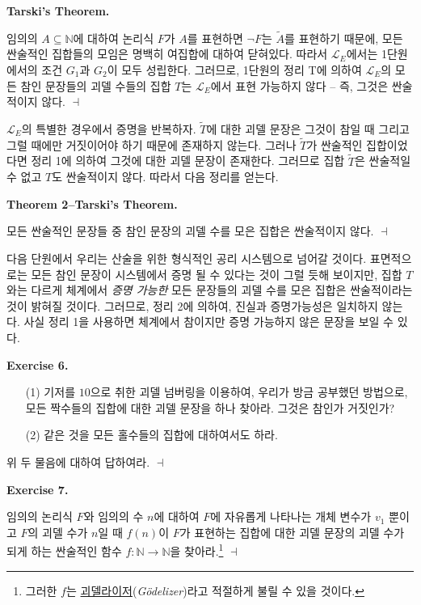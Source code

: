 \documentclass[12pt]{paper}
\newenvironment{context}[1][]
{ \noindent \textbf{{#1}.}
}
{ \hfill $ \dashv $
}
\begin{document}
\begin{context}[Tarski's Theorem]
임의의 $A \subseteq \mathbb{N}$에 대하여 논리식 $F$가 $A$를 표현하면 $\lnot F$는 $\tilde{A}$를 표현하기 때문에,
모든 싼술적인 집합들의 모임은 명백히 여집합에 대하여 닫혀있다.
따라서 $\mathcal{L}_{E}$에서는 1단원에서의 조건 $G_1$과 $G_2$이 모두 성립한다.
그러므로, 1단원의 정리 T에 의하여 $\mathcal{L}_{E}$의 모든 참인 문장들의 괴델 수들의 집합 $T$는 $\mathcal{L}_{E}$에서 표현 가능하지 않다 --
즉, 그것은 싼술적이지 않다.
\end{context}

$\mathcal{L}_{E}$의 특별한 경우에서 증명을 반복하자.
$\tilde{T}$에 대한 괴델 문장은 그것이 참일 때 그리고 그럴 때에만 거짓이어야 하기 때문에 존재하지 않는다.
그러나 $\tilde{T}$가 싼술적인 집합이었다면 정리 1에 의하여 그것에 대한 괴델 문장이 존재한다.
그러므로 집합 $\tilde{T}$은 싼술적일 수 없고 $T$도 싼술적이지 않다.
따라서 다음 정리를 얻는다.

\begin{context}[Theorem 2--Tarski's Theorem]
모든 싼술적인 문장들 중 참인 문장의 괴델 수를 모은 집합은 싼술적이지 않다.
\end{context}

다음 단원에서 우리는 산술을 위한 형식적인 공리 시스템으로 넘어갈 것이다.
표면적으로는 모든 참인 문장이 시스템에서 증명 될 수 있다는 것이 그럴 듯해 보이지만,
집합 $T$와는 다르게 체계에서 \textit{증명 가능한} 모든 문장들의 괴델 수를 모은 집합은 싼술적이라는 것이 밝혀질 것이다.
그러므로, 정리 2에 의하여, 진실과 증명가능성은 일치하지 않는다.
사실 정리 1을 사용하면 체계에서 참이지만 증명 가능하지 않은 문장을 보일 수 있다.

\begin{context}[Exercise 6]
\begin{enumerate}
\item[(1)] 기저를 $10$으로 취한 괴델 넘버링을 이용하여, 우리가 방금 공부했던 방법으로, 모든 짝수들의 집합에 대한 괴델 문장을 하나 찾아라.
그것은 참인가 거짓인가?
\item[(2)] 같은 것을 모든 홀수들의 집합에 대하여서도 하라.
\end{enumerate}

위 두 물음에 대하여 답하여라.
\end{context}

\begin{context}[Exercise 7]
임의의 논리식 $F$와 임의의 수 $n$에 대하여 $F$에 자유롭게 나타나는 개체 변수가 $v_1$ 뿐이고 $F$의 괴델 수가 $n$일 때 $f \left( n \right)$이 $F$가 표현하는 집합에 대한 괴델 문장의 괴델 수가 되게 하는 싼술적인 함수 $f : \mathbb{N} \to \mathbb{N}$을 찾아라.\footnote
{
그러한 $f$는 \underline{괴델라이저}(\textit{G\"odelizer})라고 적절하게 불릴 수 있을 것이다.
}
\end{context}
\end{document}
